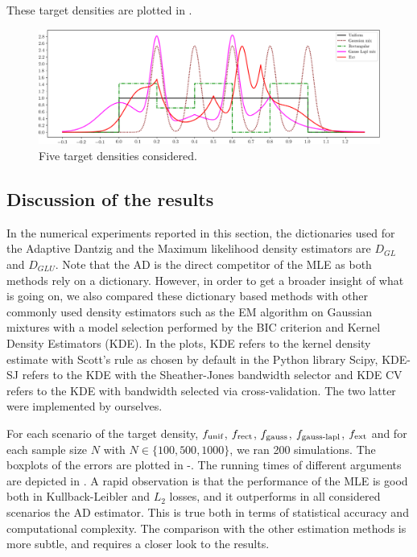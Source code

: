 These target densities are plotted in .
\begin{figure}[h]
\center
\includegraphics[width=1.1\textwidth]{TeX_files/densities_f_star.png}
\caption{Five target densities considered.}
\label{fig:target_densities}
\end{figure}

\subsection{Discussion of the results}

In the numerical experiments reported in this section, the dictionaries used for the Adaptive Dantzig 
and the Maximum likelihood density estimators are $D_{GL}$ and $D_{GLU}$. Note that the AD is the direct 
competitor of the MLE as both methods rely on a dictionary. However, in order to get a broader insight of
what is going on, we also compared these dictionary based methods with other commonly used density 
estimators such as the EM algorithm on Gaussian mixtures with a model selection performed by the BIC 
criterion and Kernel Density Estimators (KDE). In the plots, KDE refers to the kernel density estimate 
with Scott's rule as chosen by default in the Python library Scipy, KDE-SJ refers to the KDE with the 
Sheather-Jones bandwidth selector and KDE CV refers to the KDE with bandwidth selected via cross-validation. 
The two latter were implemented by ourselves. 

For each scenario of the target density, $f_{\textnormal{unif}}$, $f_{\textnormal{rect}}$, 
$f_{\textnormal{gauss}}$, $f_{\textnormal{gauss-lapl}}$, $f_{\textnormal{ext}}$ and for each sample size $N$  
with $N\in\{100, 500, 1000\}$, we ran 200 simulations. The boxplots of the errors are plotted in 
-. The running times of different arguments are 
depicted in . A rapid observation is that the performance of the MLE is good both 
in Kullback-Leibler and $L_2$ losses, and it outperforms in all considered scenarios the 
AD estimator. This is true both in terms of statistical accuracy and computational complexity. 
The comparison with the other estimation methods is more subtle, and requires a closer look
to the results.

